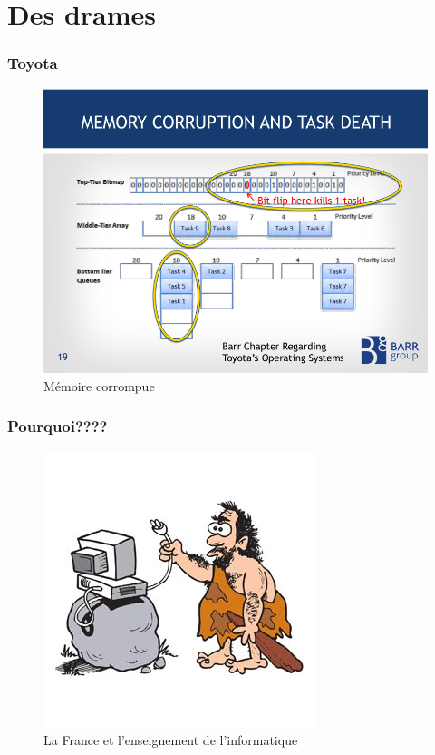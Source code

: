 \documentclass[french]{beamer}
\begin{document}
\section{Des drames}



\begin{frame}\frametitle{Toyota}

  \begin{figure}
\centering
\includegraphics[width=.9\linewidth]{toyota.jpg}
\caption{Mémoire corrompue}
\end{figure}
  
\end{frame}


\begin{frame}\frametitle{Pourquoi????}


  \begin{figure}
\centering
\includegraphics{caveman.jpg}
\caption{La France et l'enseignement de l'informatique}
\end{figure}
  
\end{frame}
\end{document}
